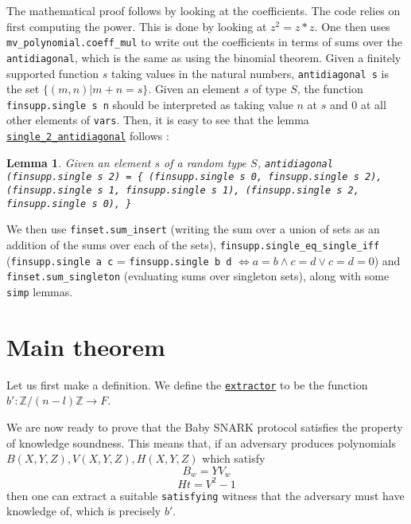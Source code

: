 \documentclass{article}
\newtheorem{lemma}{Lemma}
\theoremstyle{definition}
\theoremstyle{remark}
\begin{document}
The mathematical proof follows by looking at the coefficients. The code relies on first computing the power. This is done by looking at $z^2 = z * z$. One then uses 
\texttt{mv\_polynomial.coeff\_mul} to write out the coefficients in terms of sums over the \texttt{antidiagonal}, which is the same as using the binomial theorem. Given a 
finitely supported function $s$ taking values in the natural numbers, \texttt{antidiagonal s} is the set $\{ (m, n) | m + n = s \}$. Given an element $s$ of type $S$, 
the function \texttt{finsupp.single s n} should be interpreted as taking value $n$ at $s$ and $0$ at all other elements of \texttt{vars}. Then, it is easy to see that the lemma 
\href{https://github.com/BoltonBailey/formal-snarks-project/blob/7fd9cd122f5887f88f6a706b4f2a68a7153c7381/src/general_lemmas/single_antidiagonal.lean#L230}{\texttt{single\_2\_antidiagonal}} follows :
\theoremstyle{lemma}
\begin{lemma}
  Given an element $s$ of a random type $S$, 
  \newline \texttt{antidiagonal (finsupp.single s 2) = 
\{
  (finsupp.single s 0, finsupp.single s 2), 
  (finsupp.single s 1, finsupp.single s 1), 
  (finsupp.single s 2, finsupp.single s 0), 
\} }

\end{lemma}
We then use \texttt{finset.sum\_insert} (writing the sum over a union of sets as an addition of the sums over each of the sets), \texttt{finsupp.single\_eq\_single\_iff} 
(\texttt{finsupp.single a c} = \texttt{finsupp.single b d} $\iff a = b \wedge c = d \vee c = d = 0$) and \texttt{finset.sum\_singleton} (evaluating sums over singleton sets), along with some \texttt{simp} lemmas.

\section{Main theorem}
Let us first make a definition. We define the \href{https://github.com/BoltonBailey/formal-snarks-project/blob/7fd9cd122f5887f88f6a706b4f2a68a7153c7381/src/snarks/babysnark/knowledge_soundness.lean#L346}{\texttt{extractor}} 
to be the function $b' : \mathbb{Z}/(n - l) \mathbb{Z} \to F$.

We are now ready to prove that the Baby SNARK protocol satisfies the property of knowledge soundness. This means that, if an adversary produces polynomials 
$B(X, Y, Z), V(X, Y, Z), H(X, Y, Z)$ which satisfy 
\begin{equation}
  \label{1} B_w = YV_w
\end{equation}
\begin{equation}
  \label{2} Ht = V^2 - 1  
\end{equation}
then one can extract a suitable \texttt{satisfying} witness that the adversary must have knowledge of, which is precisely $b'$.
\end{document}
